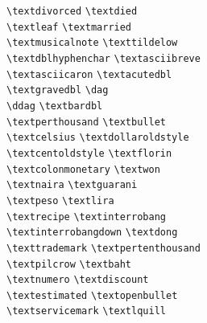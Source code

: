 {\begin{tabbing}
\textdivorced \> \verb+\textdivorced+ \> \textdied \> \verb+\textdied+\\
\textleaf \> \verb+\textleaf+ \> \textmarried \> \verb+\textmarried+\\
\textmusicalnote \> \verb+\textmusicalnote+ \> \texttildelow \> \verb+\texttildelow+\footnotemark[1] \\
\textdblhyphenchar \> \verb+\textdblhyphenchar+ \> \textasciibreve \> \verb+\textasciibreve+\footnotemark[1] \\
\textasciicaron \> \verb+\textasciicaron+\footnotemark[1]  \> \textacutedbl \> \verb+\textacutedbl+\footnotemark[1] \\
\textgravedbl \> \verb+\textgravedbl+\footnotemark[1]  \> \textdagger \> \verb+\dag+\footnotemark[1] \\
\textdaggerdbl \> \verb+\ddag+\footnotemark[1] \> \textbardbl \> \verb+\textbardbl+\footnotemark[1] \\
\textperthousand \> \verb+\textperthousand+\footnotemark[1] \> \textbullet \> \verb+\textbullet+\footnotemark[1] \\
\textcelsius \> \verb+\textcelsius+\footnotemark[1]  \> \textdollaroldstyle \> \verb+\textdollaroldstyle+\\
\textcentoldstyle \> \verb+\textcentoldstyle+ \> \textflorin \> \verb+\textflorin+\footnotemark[1] \\
\textcolonmonetary \> \verb+\textcolonmonetary+ \> \textwon \> \verb+\textwon+\\
\textnaira \> \verb+\textnaira+ \> \textguarani \> \verb+\textguarani+\\
\textpeso \> \verb+\textpeso+ \> \textlira \> \verb+\textlira+\\
\textrecipe \> \verb+\textrecipe+ \> \textinterrobang \> \verb+\textinterrobang+\\
\textinterrobangdown \> \verb+\textinterrobangdown+ \> \textdong \> \verb+\textdong+\\
\texttrademark \> \verb+\texttrademark+\footnotemark[1] \> \textpertenthousand \> \verb+\textpertenthousand+\\
\textpilcrow \> \verb+\textpilcrow+ \> \textbaht \> \verb+\textbaht+\\
\textnumero \> \verb+\textnumero+ \> \textdiscount \> \verb+\textdiscount+\\
\textestimated \> \verb+\textestimated+ \> \textopenbullet \> \verb+\textopenbullet+\\
\textservicemark \> \verb+\textservicemark+ \> \textlquill \> \verb+\textlquill+\\

\end{tabbing}}
